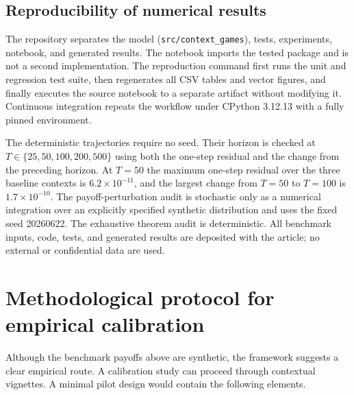 \documentclass[a4paper,fleqn]{cas-dc}
\theoremstyle{remark}
\begin{document}
\subsection{Reproducibility of numerical results}

The repository separates the model (\texttt{src/context\_games}), tests, experiments, notebook, and generated results. The notebook imports the tested package and is not a second implementation. The reproduction command first runs the unit and regression test suite, then regenerates all CSV tables and vector figures, and finally executes the source notebook to a separate artifact without modifying it. Continuous integration repeats the workflow under CPython 3.12.13 with a fully pinned environment.

The deterministic trajectories require no seed. Their horizon is checked at $T\in\{25,50,100,200,500\}$ using both the one-step residual and the change from the preceding horizon. At $T=50$ the maximum one-step residual over the three baseline contexts is $6.2\times10^{-11}$, and the largest change from $T=50$ to $T=100$ is $1.7\times10^{-10}$. The payoff-perturbation audit is stochastic only as a numerical integration over an explicitly specified synthetic distribution and uses the fixed seed 20260622. The exhaustive theorem audit is deterministic. All benchmark inputs, code, tests, and generated results are deposited with the article; no external or confidential data are used.

\FloatBarrier
\section{Methodological protocol for empirical calibration}
\label{sec:calibration}

Although the benchmark payoffs above are synthetic, the framework suggests a clear empirical route. A calibration study can proceed through contextual vignettes. A minimal pilot design would contain the following elements.
\end{document}
